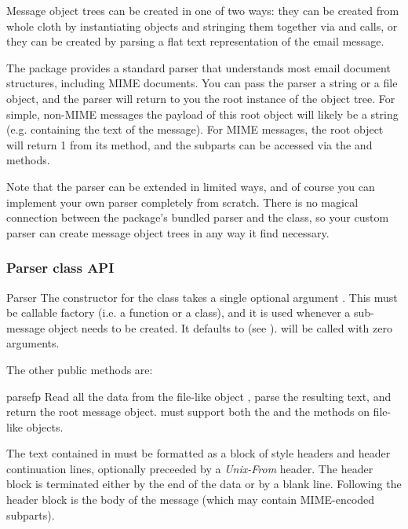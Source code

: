
Message object trees can be created in one of two ways: they can be
created from whole cloth by instantiating  objects and
stringing them together via  and
 calls, or they can be created by parsing a flat text
representation of the email message.

The  package provides a standard parser that understands
most email document structures, including MIME documents.  You can
pass the parser a string or a file object, and the parser will return
to you the root  instance of the object tree.  For
simple, non-MIME messages the payload of this root object will likely
be a string (e.g. containing the text of the message).  For MIME
messages, the root object will return 1 from its
 method, and the subparts can be accessed via
the  and  methods.

Note that the parser can be extended in limited ways, and of course
you can implement your own parser completely from scratch.  There is
no magical connection between the  package's bundled
parser and the  class, so your custom parser can create
message object trees in any way it find necessary.

\subsubsection{Parser class API}

\begin{classdesc}{Parser}{}
The constructor for the  class takes a single optional
argument .  This must be callable factory (i.e. a function
or a class), and it is used whenever a sub-message object needs to be
created.  It defaults to  (see
).   will be called with zero
arguments.
\end{classdesc}

The other public  methods are:

\begin{methoddesc}[Parser]{parse}{fp}
Read all the data from the file-like object , parse the
resulting text, and return the root message object.   must
support both the  and the  methods
on file-like objects.

The text contained in  must be formatted as a block of 
style headers and header continuation lines, optionally preceeded by a
\emph{Unix-From} header.  The header block is terminated either by the
end of the data or by a blank line.  Following the header block is the
body of the message (which may contain MIME-encoded subparts).
\end{methoddesc}

